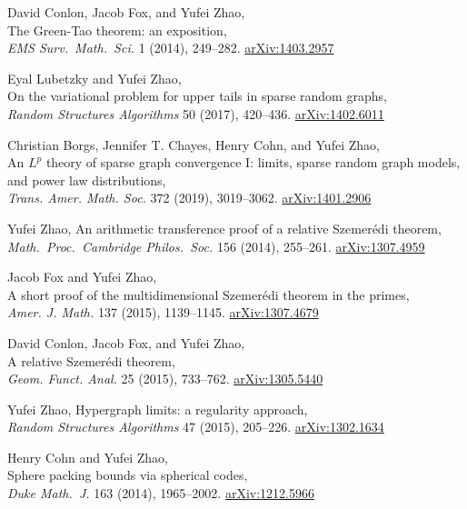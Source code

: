 \documentclass[11pt]{amsart}
\newcommand{\arXiv}[1]{\href{http://arxiv.org/abs/#1}{\color{black!50}\footnotesize\ttfamily  arXiv:#1}}
\renewcommand{\j}[1]{{\frenchspacing\itshape #1}}
\begin{document}
\begin{etaremune}[leftmargin=0.3in,itemsep=4pt,topsep=0pt,partopsep=0pt,parsep=0pt]
\item David Conlon, Jacob Fox, and Yufei Zhao, \\
  The Green-Tao theorem: an exposition, \\
  \j{EMS Surv.~Math.~Sci.} 1 (2014), 249--282.
  \arXiv{1403.2957}

\item Eyal Lubetzky and Yufei Zhao, \\
  On the variational problem for upper tails in sparse random graphs, \\
  \j{Random Structures Algorithms} 50 (2017), 420--436.
  \arXiv{1402.6011}

\item Christian Borgs, Jennifer T. Chayes, Henry Cohn, and Yufei Zhao, \\ 
  An $L^p$ theory of sparse graph convergence I: limits, sparse random
  graph models, and power law distributions, \\
  \j{Trans. Amer. Math. Soc.} 372 (2019), 3019--3062.
  \arXiv{1401.2906}

\item Yufei Zhao, 
  An arithmetic transference proof of a relative Szemer\'edi theorem, \\
  \j{Math.~Proc.~Cambridge Philos.~Soc.} 156 (2014), 255--261.
  \arXiv{1307.4959}

\item Jacob Fox and Yufei Zhao, \\
  A short proof of the multidimensional Szemer\'edi theorem in the primes, \\
  \j{Amer. J. Math.} 137 (2015), 1139--1145.
  \arXiv{1307.4679}

\item David Conlon, Jacob Fox, and Yufei Zhao, \\
  A relative Szemer\'edi theorem,  \\
  \j{Geom. Funct. Anal.} 25 (2015), 733--762.
  \arXiv{1305.5440}

\item Yufei Zhao, 
  Hypergraph limits: a regularity approach, \\
  \j{Random Structures Algorithms} 47 (2015), 205--226. %
  \arXiv{1302.1634}

\item Henry Cohn and Yufei Zhao, \\
  Sphere packing bounds via spherical codes, \\
  \j{Duke Math.~J.} 163 (2014), 1965--2002.
  \arXiv{1212.5966}


\end{etaremune}
\end{document}
